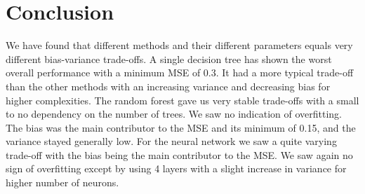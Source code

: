 \documentclass[11pt]{article}
\begin{document}
\section{Conclusion}
We have found that different methods and their different parameters equals very different bias-variance trade-offs. A single decision tree has shown the worst overall performance with a minimum MSE of 0.3. It had a more typical trade-off than the other methods with an increasing variance and decreasing bias for higher complexities. The random forest gave us very stable trade-offs with a small to no dependency on the number of trees. We saw no indication of overfitting. The bias was the main contributor to the MSE and its minimum of 0.15, and the variance stayed generally low. For the neural network we saw a quite varying trade-off with the bias being the main contributor to the MSE. We saw again no sign of overfitting except by using 4 layers with a slight increase in variance for higher number of neurons.
\end{document}
